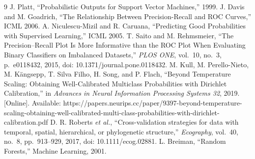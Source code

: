 \documentclass[conference]{IEEEtran}
\begin{document}
\begin{thebibliography}{9}
 J. Platt, ``Probabilistic Outputs for Support Vector Machines,'' 1999.
 J. Davis and M. Goadrich, ``The Relationship Between Precision-Recall and ROC Curves,'' ICML 2006.
 A. Niculescu-Mizil and R. Caruana, ``Predicting Good Probabilities with Supervised Learning,'' ICML 2005.
 T. Saito and M. Rehmsmeier, ``The Precision--Recall Plot Is More Informative than the ROC Plot When Evaluating Binary Classifiers on Imbalanced Datasets,'' \textit{PLOS ONE}, vol.~10, no.~3, p.~e0118432, 2015, doi: 10.1371/journal.pone.0118432.
 M. Kull, M. Perello-Nieto, M. K{\"a}ngsepp, T. Silva Filho, H. Song, and P. Flach, ``Beyond Temperature Scaling: Obtaining Well-Calibrated Multiclass Probabilities with Dirichlet Calibration,'' in \textit{Advances in Neural Information Processing Systems 32}, 2019. [Online]. Available: https://papers.neurips.cc/paper/9397-beyond-temperature-scaling-obtaining-well-calibrated-multi-class-probabilities-with-dirichlet-calibration.pdf
 D. R. Roberts \textit{et al.}, ``Cross-validation strategies for data with temporal, spatial, hierarchical, or phylogenetic structure,'' \textit{Ecography}, vol.~40, no.~8, pp.~913--929, 2017, doi: 10.1111/ecog.02881.
 L. Breiman, ``Random Forests,'' Machine Learning, 2001.
\end{thebibliography}
\end{document}
